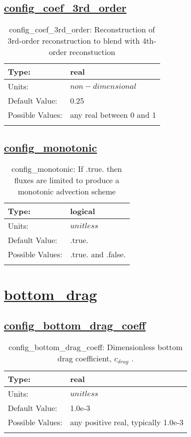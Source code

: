 \subsection[config\_coef\_3rd\_order]{\hyperref[sec:nm_tab_advection]{config\_coef\_3rd\_order}}
\label{subsec:nm_sec_config_coef_3rd_order}
\begin{center}
\begin{longtable}{| p{2.0in} | p{4.0in} |}
    \hline
    Type: & real \\
    \hline
    Units: & $non-dimensional$ \\
    \hline
    Default Value: & 0.25 \\
    \hline
    Possible Values: & any real between 0 and 1 \\
    \hline
    \caption{config\_coef\_3rd\_order: Reconstruction of 3rd-order reconstruction to blend with 4th-order reconstuction}
\end{longtable}
\end{center}
\subsection[config\_monotonic]{\hyperref[sec:nm_tab_advection]{config\_monotonic}}
\label{subsec:nm_sec_config_monotonic}
\begin{center}
\begin{longtable}{| p{2.0in} | p{4.0in} |}
    \hline
    Type: & logical \\
    \hline
    Units: & $unitless$ \\
    \hline
    Default Value: & .true. \\
    \hline
    Possible Values: & .true. and .false. \\
    \hline
    \caption{config\_monotonic: If .true. then fluxes are limited to produce a monotonic advection scheme}
\end{longtable}
\end{center}
\section[bottom\_drag]{\hyperref[sec:nm_tab_bottom_drag]{bottom\_drag}}
\label{sec:nm_sec_bottom_drag}
\subsection[config\_bottom\_drag\_coeff]{\hyperref[sec:nm_tab_bottom_drag]{config\_bottom\_drag\_coeff}}
\label{subsec:nm_sec_config_bottom_drag_coeff}
\begin{center}
\begin{longtable}{| p{2.0in} | p{4.0in} |}
    \hline
    Type: & real \\
    \hline
    Units: & $unitless$ \\
    \hline
    Default Value: & 1.0e-3 \\
    \hline
    Possible Values: & any positive real, typically 1.0e-3 \\
    \hline
    \caption{config\_bottom\_drag\_coeff:  Dimensionless bottom drag coefficient,  $c_{drag}$ .}
\end{longtable}
\end{center}
